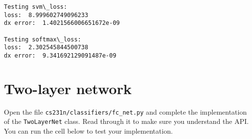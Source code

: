\documentclass[11pt]{article}
\begin{document}
    \begin{Verbatim}[commandchars=\\\{\}]
Testing svm\_loss:
loss:  8.999602749096233
dx error:  1.4021566006651672e-09

Testing softmax\_loss:
loss:  2.302545844500738
dx error:  9.341692129091487e-09
    \end{Verbatim}

    \hypertarget{two-layer-network}{%
\section{Two-layer network}\label{two-layer-network}}

Open the file \texttt{cs231n/classifiers/fc\_net.py} and complete the
implementation of the \texttt{TwoLayerNet} class. Read through it to
make sure you understand the API. You can run the cell below to test
your implementation.
\end{document}
